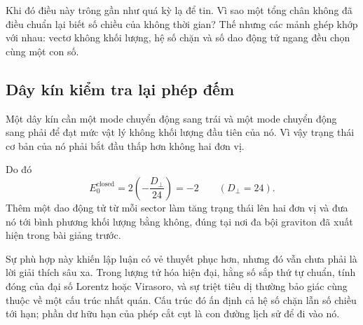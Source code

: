 \begin{classroomqa}
\end{classroomqa}

Khi đó điều này trông gần như quá kỳ lạ để tin. Vì sao một tổng chân không đã điều chuẩn lại biết số chiều của không thời gian? Thế nhưng các mảnh ghép khớp với nhau: vectơ không khối lượng, hệ số chặn và số dao động tử ngang đều chọn cùng một con số.

\subsection{Dây kín kiểm tra lại phép đếm}

Một dây kín cần một mode chuyển động sang trái và một mode chuyển động sang phải để đạt mức vật lý không khối lượng đầu tiên của nó. Vì vậy trạng thái cơ bản của nó phải bắt đầu thấp hơn không hai đơn vị.

\begin{classroomqa}
\end{classroomqa}

Do đó
\begin{equation}
  E_0^{\mathrm{closed}}
  =
  2\left(-\frac{D_\perp}{24}\right)
  =-2
  \qquad (D_\perp=24).
\end{equation}
Thêm một dao động tử từ mỗi sector làm tăng trạng thái lên hai đơn vị và đưa nó tới bình phương khối lượng bằng không, đúng tại nơi đa bội graviton đã xuất hiện trong bài giảng trước.

Sự phù hợp này khiến lập luận có vẻ thuyết phục hơn, nhưng đó vẫn chưa phải là lời giải thích sâu xa. Trong lượng tử hóa hiện đại, hằng số sắp thứ tự chuẩn, tính đóng của đại số Lorentz hoặc Virasoro, và sự triệt tiêu dị thường bảo giác cùng thuộc về một cấu trúc nhất quán. Cấu trúc đó ấn định cả hệ số chặn lẫn số chiều tới hạn; phần dư hữu hạn của phép cắt cụt là con đường lịch sử để đi vào nó.

